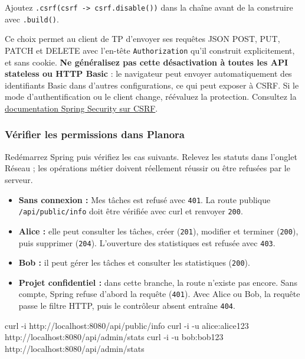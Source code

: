 \documentclass[
  french,
  10pt,
  a4paper,
]{article}
\newenvironment{Shaded}{}{}
\newcommand{\AttributeTok}[1]{\textcolor[rgb]{0.49,0.56,0.16}{#1}}
\newcommand{\ExtensionTok}[1]{#1}
\newcommand{\NormalTok}[1]{#1}
\providecommand{\tightlist}{%
  \setlength{\itemsep}{0pt}\setlength{\parskip}{0pt}}
\begin{document}
Ajoutez \texttt{.csrf(csrf\ -\textgreater{}\ csrf.disable())} dans la
chaîne avant de la construire avec \texttt{.build()}.

Ce choix permet au client de TP d'envoyer ses requêtes JSON POST, PUT,
PATCH et DELETE avec l'en-tête \texttt{Authorization} qu'il construit
explicitement, et sans cookie. \textbf{Ne généralisez pas cette
désactivation à toutes les API stateless ou HTTP Basic} : le navigateur
peut envoyer automatiquement des identifiants Basic dans d'autres
configurations, ce qui peut exposer à CSRF. Si le mode
d'authentification ou le client change, réévaluez la protection.
Consultez la
\href{https://docs.spring.io/spring-security/reference/features/exploits/csrf.html}{documentation
Spring Security sur CSRF}.

\subsubsection{Vérifier les permissions dans
Planora}\label{vuxe9rifier-les-permissions-dans-planora}

Redémarrez Spring puis vérifiez les cas suivants. Relevez les statuts
dans l'onglet Réseau ; les opérations métier doivent réellement réussir
ou être refusées par le serveur.

\begin{itemize}
\tightlist
\item
  \textbf{Sans connexion :} Mes tâches est refusé avec \texttt{401}. La
  route publique \texttt{/api/public/info} doit être vérifiée avec curl
  et renvoyer \texttt{200}.
\item
  \textbf{Alice :} elle peut consulter les tâches, créer (\texttt{201}),
  modifier et terminer (\texttt{200}), puis supprimer (\texttt{204}).
  L'ouverture des statistiques est refusée avec \texttt{403}.
\item
  \textbf{Bob :} il peut gérer les tâches et consulter les statistiques
  (\texttt{200}).
\item
  \textbf{Projet confidentiel :} dans cette branche, la route n'existe
  pas encore. Sans compte, Spring refuse d'abord la requête
  (\texttt{401}). Avec Alice ou Bob, la requête passe le filtre HTTP,
  puis le contrôleur absent entraîne \texttt{404}.
\end{itemize}

\begin{Shaded}
\begin{Highlighting}[]
\ExtensionTok{curl} \AttributeTok{{-}i}\NormalTok{ http://localhost:8080/api/public/info}
\ExtensionTok{curl} \AttributeTok{{-}i} \AttributeTok{{-}u}\NormalTok{ alice:alice123 http://localhost:8080/api/admin/stats}
\ExtensionTok{curl} \AttributeTok{{-}i} \AttributeTok{{-}u}\NormalTok{ bob:bob123 http://localhost:8080/api/admin/stats}
\end{Highlighting}
\end{Shaded}
\end{document}
